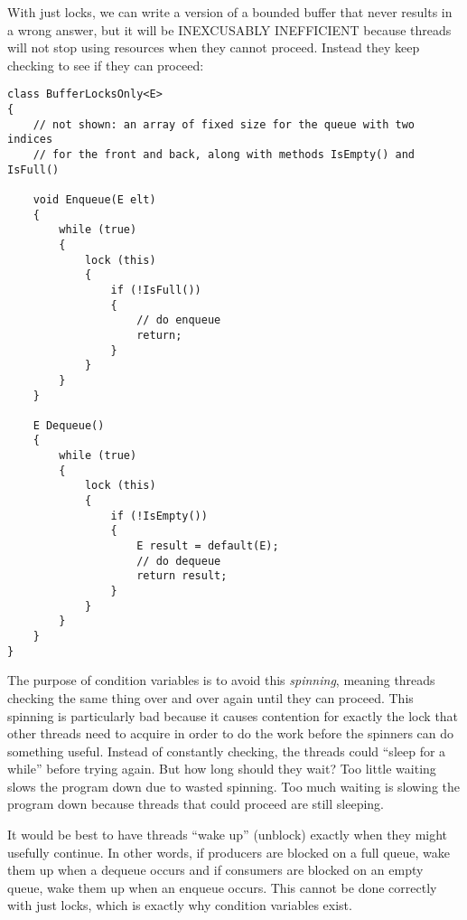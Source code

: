 \documentclass[10pt]{article}
\begin{document}
With just locks, we can write a version of a bounded buffer that
never results in a wrong answer, but it will be INEXCUSABLY
INEFFICIENT because threads will not stop using resources when they
cannot proceed.  Instead they keep checking to see if they can
proceed:
\begin{verbatim}
class BufferLocksOnly<E>
{
    // not shown: an array of fixed size for the queue with two indices
    // for the front and back, along with methods IsEmpty() and IsFull()

    void Enqueue(E elt)
    {
        while (true)
        {
            lock (this)
            {
                if (!IsFull())
                {
                    // do enqueue
                    return;
                }
            }
        }
    }

    E Dequeue()
    {
        while (true)
        {
            lock (this)
            {
                if (!IsEmpty())
                {
                    E result = default(E);
                    // do dequeue
                    return result;
                }
            }
        }
    }
}
\end{verbatim}
The purpose of condition variables is to avoid this \emph{spinning},
meaning threads checking the same thing over and over again until they
can proceed.  This spinning is particularly bad because it causes
contention for exactly the lock that other threads need to acquire in
order to do the work before the spinners can do something useful.
Instead of constantly checking, the threads could ``sleep for a
while'' before trying again.  But how long should they wait?  Too
little waiting slows the program down due to wasted spinning.  Too
much waiting is slowing the program down because threads that could
proceed are still sleeping.

It would be best to have threads ``wake up'' (unblock) exactly when
they might usefully continue.  In other words, if producers are
blocked on a full queue, wake them up when a dequeue occurs and if
consumers are blocked on an empty queue, wake them up when an enqueue
occurs.  This cannot be done correctly with just locks, which is
exactly why condition variables exist.  
\end{document}
